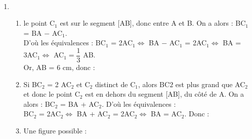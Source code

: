 \ \\ [-5mm]
   \begin{enumerate}
      \item
      \begin{enumerate}
         \item le point C$_1$ est sur le segment [AB], donc entre A et B. On a alors : BC$_1$ = BA $-$ AC$_1$. \\
         D'où les équivalences : BC$_1$ = 2AC$_1 \iff$ BA $-$ AC$_1$ = 2AC$_1 \iff$ BA = 3AC$_1 \iff$ AC$_1 = \dfrac13$ AB. \\
         Or, AB = 6 cm, donc : 
         \item Si BC$_2$ = 2 AC$_2$ et C$_2$ distinct de C$_1$, alors BC$2$ est plus grand que AC$_2$ et donc le point C$_2$ est en dehors du segment [AB], du côté de A. On a alors : BC$_2$ = BA + AC$_2$. D'où les équivalences : \\
         BC$_2$ = 2AC$_2 \iff$ BA + AC$_2$ = 2AC$_2 \iff$ BA = AC$_2$. Donc : 
         \item Une figure possible :
      \end{enumerate}
  \end{enumerate}
   \Coupe

